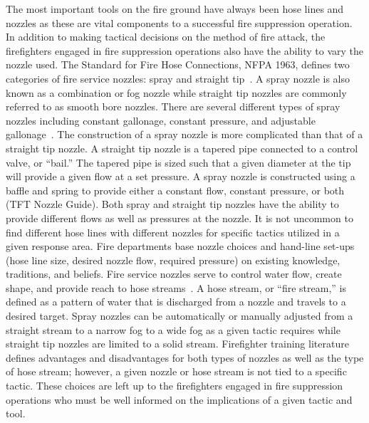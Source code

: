 \documentclass[12pt,oneside]{book}
\begin{document}
The most important tools on the fire ground have always been hose lines and nozzles as these are vital components to a successful fire suppression operation. In addition to making tactical decisions on the method of fire attack, the firefighters engaged in fire suppression operations also have the ability to vary the nozzle used. The Standard for Fire Hose Connections, NFPA 1963, defines two categories of fire service nozzles: spray and straight tip~\cite{NFPA1963}. A spray nozzle is also known as a combination or fog nozzle while straight tip nozzles are commonly referred to as smooth bore nozzles. There are several different types of spray nozzles including constant gallonage, constant pressure, and adjustable gallonage~\cite{FEHandbook}. The construction of a spray nozzle is more complicated than that of a straight tip nozzle. A straight tip nozzle is a tapered pipe connected to a control valve, or ``bail.'' The tapered pipe is sized such that a given diameter at the tip will provide a given flow at a set pressure. A spray nozzle is constructed using a baffle and spring to provide either a constant flow, constant pressure, or both (TFT Nozzle Guide). Both spray and straight tip nozzles have the ability to provide different flows as well as pressures at the nozzle. It is not uncommon to find different hose lines with different nozzles for specific tactics utilized in a given response area. Fire departments base nozzle choices and hand-line set-ups (hose line size, desired nozzle flow, required pressure) on existing knowledge, traditions, and beliefs. Fire service nozzles serve to control water flow, create shape, and provide reach to hose streams~\cite{Essentials6}. A hose stream, or ``fire stream,'' is defined as a pattern of water that is discharged from a nozzle and travels to a desired target. Spray nozzles can be automatically or manually adjusted from a straight stream to a narrow fog to a wide fog as a given tactic requires while straight tip nozzles are limited to a solid stream. Firefighter training literature defines advantages and disadvantages for both types of nozzles as well as the type of hose stream; however, a given nozzle or hose stream is not tied to a specific tactic. These choices are left up to the firefighters engaged in fire suppression operations who must be well informed on the implications of a given tactic and tool.
\end{document}
